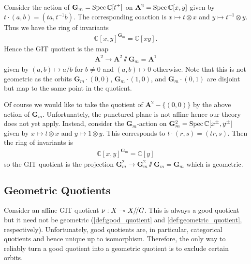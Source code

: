 \documentclass[12pt]{ociamthesis}  %
\begin{document}
\begin{example}\label{ex:nice_multiplicative_action}
  Consider the action of $\mathbf G_m=\operatorname{Spec}\mathbb C[t^\pm]$
  on $\mathbf A^2=\operatorname{Spec}\mathbb C[x,y]$ given by $t\cdot(a,b) = (ta,t^{-1}b)$.
  The corresponding coaction is $x \mapsto t\otimes x$ and $y\mapsto t^{-1}\otimes y$.
  Thus we have the ring of invariants
  \begin{align*}
    \mathbb C[x,y]^{\mathbf G_m} = \mathbb C[xy].
  \end{align*}
  Hence the GIT quotient is the map
  \begin{align*}
    \mathbf A^2 \longrightarrow \mathbf A^2 \sslash \mathbf G_m = \mathbf A^1
  \end{align*}
  given by $(a,b)\mapsto a/b$ for $b \neq 0$ and $(a,b)\mapsto 0$ otherwise.
  Note that this is not geometric as the orbits $\mathbf G_m\cdot(0,0)$,
  $\mathbf G_m\cdot (1,0)$, and $\mathbf G_m\cdot(0,1)$ are disjoint but
  map to the same point in the quotient.
\end{example}

\begin{example}
  Of course we would like to take the quotient of $\mathbf A^2-\{(0,0)\}$
  by the above action of $\mathbf G_m$. Unfortunately, the punctured
  plane is not affine hence our theory does not yet apply. Instead,
  consider the $\mathbf G_m$-action on $\mathbf G_m^2 = \operatorname{Spec}\mathbb C[x^\pm,y^\pm]$
  given by $x \mapsto t\otimes x$ and $y\mapsto 1\otimes y$. This
  corresponds to $t\cdot(r,s) = (tr, s)$. Then the ring of invariants
  is
  \begin{align*}
    \mathbb C[x,y]^{\mathbf G_m} = \mathbb C[y]
  \end{align*}
  so the GIT quotient is the projection
  $\mathbf G^2_m \to \mathbf G^2_m \sslash \mathbf G_m = \mathbf G_m$
  which is geometric.
\end{example}

\subsection{Geometric Quotients}

Consider an affine GIT quotient $\nu : X \twoheadrightarrow X/\!/ G$. This is
always a good quotient but it need not be geometric
(\ref{def:good_quotient} and \ref{def:geometric_quotient}, respectively).
Unfortunately, good quotients are, in particular, categorical
quotients \cite[Proposition 3.30]{hoskins2016} and hence unique
up to isomorphism. Therefore, the only way to reliably turn a good
quotient into a geometric quotient is to exclude certain orbits.
\end{document}
